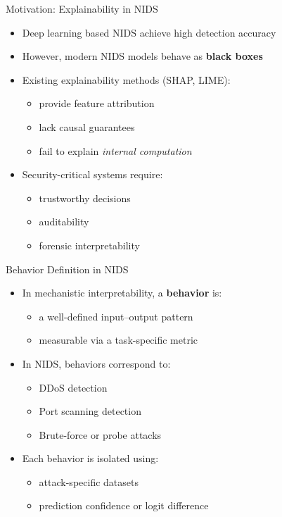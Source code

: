 \documentclass{beamer}
\begin{document}
	\begin{frame}{Motivation: Explainability in NIDS}
		\begin{itemize}
			\item Deep learning based NIDS achieve high detection accuracy
			\item However, modern NIDS models behave as \textbf{black boxes}
			\item Existing explainability methods (SHAP, LIME):
			\begin{itemize}
				\item provide feature attribution
				\item lack causal guarantees
				\item fail to explain \emph{internal computation}
			\end{itemize}
			\item Security-critical systems require:
			\begin{itemize}
				\item trustworthy decisions
				\item auditability
				\item forensic interpretability
			\end{itemize}
		\end{itemize}
	\end{frame}
	
	\begin{frame}{Behavior Definition in NIDS}
		\begin{itemize}
			\item In mechanistic interpretability, a \textbf{behavior} is:
			\begin{itemize}
				\item a well-defined input–output pattern
				\item measurable via a task-specific metric
			\end{itemize}
			\item In NIDS, behaviors correspond to:
			\begin{itemize}
				\item DDoS detection
				\item Port scanning detection
				\item Brute-force or probe attacks
			\end{itemize}
			\item Each behavior is isolated using:
			\begin{itemize}
				\item attack-specific datasets
				\item prediction confidence or logit difference
			\end{itemize}
		\end{itemize}
	\end{frame}
\end{document}
